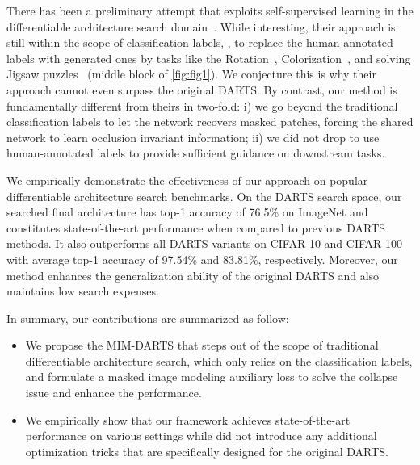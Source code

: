 \documentclass[10pt,twocolumn,letterpaper]{article}
\begin{document}
There has been a preliminary attempt that exploits self-supervised learning in the differentiable architecture search domain~\cite{liu_2020_unnas}. While interesting, their approach is still within the scope of classification labels, \ie, to replace 
the human-annotated labels
with generated ones by tasks like
the Rotation~\cite{gidaris_2018_rotation}, Colorization~\cite{zhang_2016_col}, and solving Jigsaw puzzles~\cite{noroozi_2016_jigsaw} (middle block of \cref{fig:fig1}). 
We conjecture this is why their approach cannot even surpass the original DARTS.
By contrast, our method is fundamentally different from theirs in two-fold: 
i) we go beyond the traditional classification labels to let the network recovers masked patches, forcing the shared network to learn occlusion invariant information;
ii) we did not drop to use human-annotated labels to provide sufficient guidance on downstream tasks.  

We empirically demonstrate the effectiveness of our approach on popular differentiable architecture search benchmarks. 
On the DARTS search space, our searched final architecture has top-1 accuracy of 76.5\% on ImageNet and constitutes state-of-the-art performance when compared to previous DARTS methods.
It also outperforms all DARTS variants on CIFAR-10 and CIFAR-100 with average top-1 accuracy of 97.54\% and 83.81\%, respectively.
Moreover, our method enhances the generalization ability of the original DARTS and also maintains low search expenses.

In summary, our contributions are summarized as follow:
\begin{itemize}[leftmargin=8pt,itemsep=-1pt,topsep=0pt]
  \item We propose the MIM-DARTS that steps out of the scope of traditional differentiable architecture search, which only relies on the classification labels, and formulate a masked image modeling auxiliary loss to solve the collapse issue and enhance the performance.
  \item We empirically show that our framework achieves state-of-the-art performance on various settings while did not introduce any additional optimization tricks that are specifically designed for the original DARTS.
\end{itemize}
\vspace{-4pt}
\end{document}
